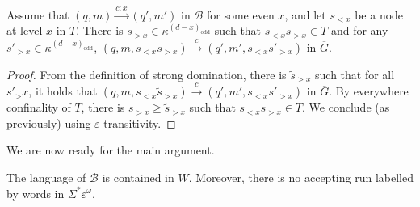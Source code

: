 \documentclass[a4paper,UKenglish,cleveref, thm-restate]{lipics-v2021}
\newcommand{\re}[1]{\xrightarrow{#1}}
\newcommand{\tin}{\text{ in }}
\newcommand{\eps}{\varepsilon}
\newcommand{\odd}{\mathrm{odd}}
\newcommand{\B}{\mathcal B}
\begin{document}
\begin{lemma}\label{lem:technical2}
    Assume that $(q,m) \re{c:x} (q',m') \tin \B$ for some even $x$, and let $s_{< x}$ be a node at level $x$ in $T$.
    There is $s_{> x} \in \kappa^{(d-x)_\odd}$ such that $s_{< x}s_{> x} \in T$ and for any $s'_{> x} \in \kappa^{(d-x)_\odd}$, $(q,m,s_{< x}s_{> x}) \re c (q',m',s_{<x}s'_{> x})$ in $\overline G$.
\end{lemma}

\begin{proof}
    From the definition of strong domination, there is $\tilde s_{>x}$ such that for all $s'_>x$, it holds that $(q,m,s_{<x} \tilde s_{>x}) \re c (q',m',s_{<x} s'_{>x})$ in $\overline G$. By everywhere confinality of $T$, there is $s_{>x} 
    \geq \tilde s_{>x}$ such that $s_{<x} s_{>x} \in T$.
    We conclude (as previously) using $\eps$-transitivity.
\end{proof}

We are now ready for the main argument.

\begin{lemma}\label{lem:language-containement}
    The language of $\B$ is contained in $W$.
    Moreover, there is no accepting run labelled by words in $\Sigma^* \eps^\omega$.
\end{lemma}
\end{document}
